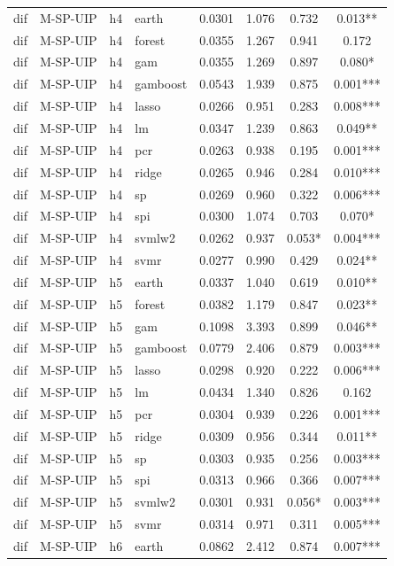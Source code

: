 \begin{ThreePartTable}
\begin{longtable}[t]{llclcccc}
\addlinespace
dif & M-SP-UIP & h4 & earth & 0.0301 & 1.076 & 0.732 & 0.013**\\
dif & M-SP-UIP & h4 & forest & 0.0355 & 1.267 & 0.941 & 0.172\\
dif & M-SP-UIP & h4 & gam & 0.0355 & 1.269 & 0.897 & 0.080*\\
dif & M-SP-UIP & h4 & gamboost & 0.0543 & 1.939 & 0.875 & 0.001***\\
dif & M-SP-UIP & h4 & lasso & 0.0266 & 0.951 & 0.283 & 0.008***\\
dif & M-SP-UIP & h4 & lm & 0.0347 & 1.239 & 0.863 & 0.049**\\
dif & M-SP-UIP & h4 & pcr & 0.0263 & 0.938 & 0.195 & 0.001***\\
dif & M-SP-UIP & h4 & ridge & 0.0265 & 0.946 & 0.284 & 0.010***\\
dif & M-SP-UIP & h4 & sp & 0.0269 & 0.960 & 0.322 & 0.006***\\
dif & M-SP-UIP & h4 & spi & 0.0300 & 1.074 & 0.703 & 0.070*\\
dif & M-SP-UIP & h4 & svmlw2 & 0.0262 & 0.937 & 0.053* & 0.004***\\
dif & M-SP-UIP & h4 & svmr & 0.0277 & 0.990 & 0.429 & 0.024**\\
\addlinespace
dif & M-SP-UIP & h5 & earth & 0.0337 & 1.040 & 0.619 & 0.010**\\
dif & M-SP-UIP & h5 & forest & 0.0382 & 1.179 & 0.847 & 0.023**\\
dif & M-SP-UIP & h5 & gam & 0.1098 & 3.393 & 0.899 & 0.046**\\
dif & M-SP-UIP & h5 & gamboost & 0.0779 & 2.406 & 0.879 & 0.003***\\
dif & M-SP-UIP & h5 & lasso & 0.0298 & 0.920 & 0.222 & 0.006***\\
dif & M-SP-UIP & h5 & lm & 0.0434 & 1.340 & 0.826 & 0.162\\
dif & M-SP-UIP & h5 & pcr & 0.0304 & 0.939 & 0.226 & 0.001***\\
dif & M-SP-UIP & h5 & ridge & 0.0309 & 0.956 & 0.344 & 0.011**\\
dif & M-SP-UIP & h5 & sp & 0.0303 & 0.935 & 0.256 & 0.003***\\
dif & M-SP-UIP & h5 & spi & 0.0313 & 0.966 & 0.366 & 0.007***\\
dif & M-SP-UIP & h5 & svmlw2 & 0.0301 & 0.931 & 0.056* & 0.003***\\
dif & M-SP-UIP & h5 & svmr & 0.0314 & 0.971 & 0.311 & 0.005***\\
\addlinespace
dif & M-SP-UIP & h6 & earth & 0.0862 & 2.412 & 0.874 & 0.007***\\

\end{longtable}
\end{ThreePartTable}
